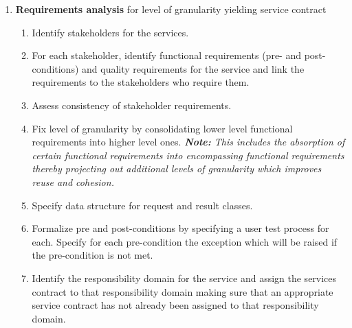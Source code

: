 \begin{enumerate}
 \item {\bf Requirements analysis} for level of granularity yielding service contract
  \begin{enumerate}
    \item Identify stakeholders for the services.
    \item For each stakeholder, identify functional requirements (pre- and post-conditions) and quality requirements for the service and link the requirements to the stakeholders who require them.
    \item Assess consistency of stakeholder requirements.
    \item Fix level of granularity by consolidating lower level functional requirements into higher level ones. 
	  \emph{\textbf{\textit{Note:}} This includes the absorption of certain functional requirements into encompassing functional requirements thereby projecting out additional levels of granularity which improves reuse and cohesion.}
    \item Specify data structure for request and result classes.
    \item Formalize pre and post-conditions by specifying a user test process for each. Specify for each pre-condition the exception which will be raised if the pre-condition is not met.
    \item Identify the responsibility domain for the service and assign the services contract to that responsibility domain making sure that an appropriate service contract has not already been assigned to that responsibility domain. 
  \end{enumerate}


\end{enumerate}
